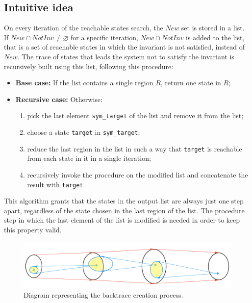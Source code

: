 \documentclass[12pt]{article}
\begin{document}
    \subsection{Intuitive idea}
    On every iteration of the reachable states search, the $New$ set is stored in a list.
    If $New \cap NotInv \neq \varnothing$ for a specific iteration, $New \cap NotInv$ is added to the list, that is a set of reachable states in which the invariant is not satisfied, instead of $New$.
    The trace of states that leads the system not to satisfy the invariant is recursively built using this list, following this procedure:
    \begin{itemize}
        \item \textbf{Base case:} If the list contains a single region $R$, return one state in $R$;
        \item \textbf{Recursive case:} Otherwise:
        \begin{enumerate}
            \item pick the last element \texttt{sym\_target} of the list and remove it from the list;
            \item choose a state \texttt{target} in \texttt{sym\_target};
            \item reduce the last region in the list in such a way that \texttt{target} is reachable from each state in it in a single iteration;
            \item recursively invoke the procedure on the modified list and concatenate the result with \texttt{target}.
        \end{enumerate}
    \end{itemize}
    This algorithm grants that the states in the output list are always just one step apart, regardless of the state chosen in the last region of the list.
    The procedure step in which the last element of the list is modified is needed in order to keep this property valid.
    
    \begin{figure}[H] 
        \centering
        \includegraphics[width=\textwidth]{backtrace-diagram.png}
        \caption{Diagram representing the backtrace creation process.}
        \label{fig:back_trace}
    \end{figure}
    
\end{document}
